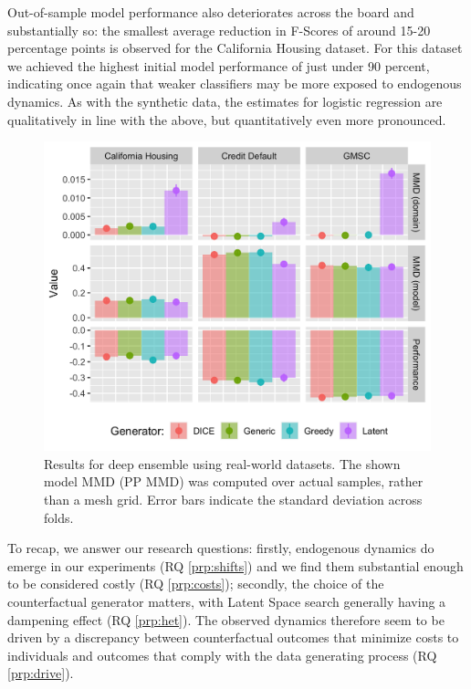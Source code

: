 \documentclass[conference,final,]{IEEEtran}
\theoremstyle{definition}
\theoremstyle{definition}
\theoremstyle{definition}
\theoremstyle{definition}
\theoremstyle{remark}
\begin{document}
Out-of-sample model performance also deteriorates across the board and substantially so: the smallest average reduction in F-Scores of around 15-20 percentage points is observed for the California Housing dataset. For this dataset we achieved the highest initial model performance of just under 90 percent, indicating once again that weaker classifiers may be more exposed to endogenous dynamics. As with the synthetic data, the estimates for logistic regression are qualitatively in line with the above, but quantitatively even more pronounced.

\begin{figure}

{\centering \includegraphics[width=0.9\linewidth]{www/real_world_results} 

}

\caption{Results for deep ensemble using real-world datasets. The shown model MMD (PP MMD) was computed over actual samples, rather than a mesh grid. Error bars indicate the standard deviation across folds.}\label{fig:real}
\end{figure}

To recap, we answer our research questions: firstly, endogenous dynamics do emerge in our experiments (RQ \ref{prp:shifts}) and we find them substantial enough to be considered costly (RQ \ref{prp:costs}); secondly, the choice of the counterfactual generator matters, with Latent Space search generally having a dampening effect (RQ \ref{prp:het}). The observed dynamics therefore seem to be driven by a discrepancy between counterfactual outcomes that minimize costs to individuals and outcomes that comply with the data generating process (RQ \ref{prp:drive}).
\end{document}
